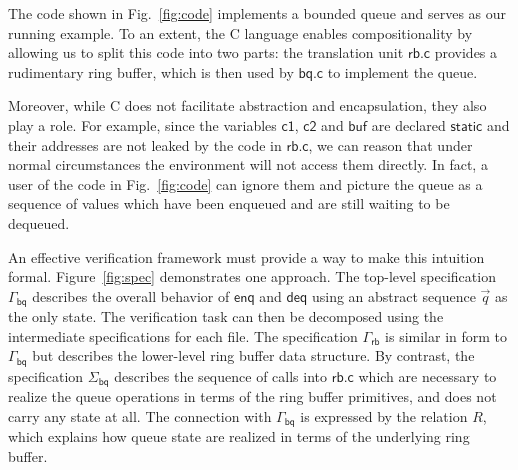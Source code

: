 \documentclass[acmsmall,screen,review,anonymous]{acmart}
\newcommand{\kw}[1]{\ensuremath{ \mathsf{#1} }}
\begin{document}
\begin{example}
The code shown in Fig.~\ref{fig:code}
implements a bounded queue
and serves as our running example.
To an extent,
the C language enables compositionality
by allowing us to split this code into two parts:
the translation unit $\kw{rb.c}$
provides a rudimentary ring buffer,
which is then used by $\kw{bq.c}$
to implement the queue.

Moreover,
while C does not facilitate abstraction and encapsulation,
they also play a role.
For example,
since the variables $\kw{c1}$, $\kw{c2}$ and $\kw{buf}$
are declared $\kw{static}$ and
their addresses are not leaked by the code in $\kw{rb.c}$,
we can reason that under normal circumstances
the environment will not access them directly.
In fact,
a user of the code in Fig.~\ref{fig:code}
can ignore them and picture the queue
as a sequence of values which have been enqueued
and are still waiting to be dequeued.

An effective verification framework
must provide a way to make this intuition formal.
Figure~\ref{fig:spec} demonstrates one approach.
The top-level specification $\Gamma_\kw{bq}$
describes the overall behavior of $\kw{enq}$ and $\kw{deq}$
using an abstract sequence $\vec{q}$ as the only state.
The verification task can then be decomposed using
the intermediate specifications for each file.
The specification
$\Gamma_\kw{rb}$ is similar in form to $\Gamma_\kw{bq}$
but describes the lower-level ring buffer data structure.
By contrast, the specification
$\Sigma_\kw{bq}$ describes
the sequence of calls into $\kw{rb.c}$
which are necessary to realize the queue operations
in terms of the ring buffer primitives,
and does not carry any state at all.
The connection with $\Gamma_\kw{bq}$
is expressed by the relation $R$,
which explains how queue state
are realized in terms of the underlying ring buffer.
\end{example}

\end{document}
